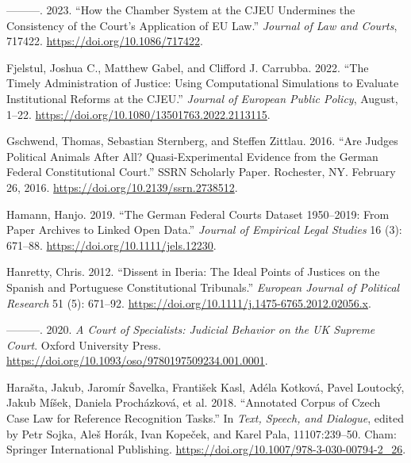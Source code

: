 \documentclass[
  11pt,
]{article}
\newlength{\cslhangindent}
\newenvironment{CSLReferences}[2] %
 {%
  \setlength{\parindent}{0pt}
  \ifodd #1 \everypar{\setlength{\hangindent}{\cslhangindent}}\ignorespaces\fi
  \ifnum #2 > 0
  \setlength{\parskip}{#2\baselineskip}
  \fi
 }%
 {}
\begin{document}
\begin{CSLReferences}{1}{0}
\leavevmode{}%
---------. 2023. {``How the {Chamber System} at the {CJEU Undermines}
the {Consistency} of the {Court}'s {Application} of {EU Law}.''}
\emph{Journal of Law and Courts}, 717422.
\url{https://doi.org/10.1086/717422}.

\leavevmode{}%
Fjelstul, Joshua C., Matthew Gabel, and Clifford J. Carrubba. 2022.
{``The Timely Administration of Justice: Using Computational Simulations
to Evaluate Institutional Reforms at the {CJEU}.''} \emph{Journal of
European Public Policy}, August, 1--22.
\url{https://doi.org/10.1080/13501763.2022.2113115}.

\leavevmode{}%
Gschwend, Thomas, Sebastian Sternberg, and Steffen Zittlau. 2016. {``Are
{Judges Political Animals} After {All}? {Quasi-Experimental Evidence}
from the {German Federal Constitutional Court}.''} SSRN Scholarly Paper.
{Rochester, NY}. February 26, 2016.
\url{https://doi.org/10.2139/ssrn.2738512}.

\leavevmode{}%
Hamann, Hanjo. 2019. {``The {German Federal Courts Dataset} 1950--2019:
{From Paper Archives} to {Linked Open Data}.''} \emph{Journal of
Empirical Legal Studies} 16 (3): 671--88.
\url{https://doi.org/10.1111/jels.12230}.

\leavevmode{}%
Hanretty, Chris. 2012. {``Dissent in {Iberia}: {The} Ideal Points of
Justices on the {Spanish} and {Portuguese Constitutional Tribunals}.''}
\emph{European Journal of Political Research} 51 (5): 671--92.
\url{https://doi.org/10.1111/j.1475-6765.2012.02056.x}.

\leavevmode{}%
---------. 2020. \emph{A {Court} of {Specialists}: {Judicial Behavior}
on the {UK Supreme Court}}. {Oxford University Press}.
\url{https://doi.org/10.1093/oso/9780197509234.001.0001}.

\leavevmode{}%
Harašta, Jakub, Jaromír Šavelka, František Kasl, Adéla Kotková, Pavel
Loutocký, Jakub Míšek, Daniela Procházková, et al. 2018. {``Annotated
{Corpus} of {Czech Case Law} for {Reference Recognition Tasks}.''} In
\emph{Text, {Speech}, and {Dialogue}}, edited by Petr Sojka, Aleš Horák,
Ivan Kopeček, and Karel Pala, 11107:239--50. {Cham}: {Springer
International Publishing}.
\url{https://doi.org/10.1007/978-3-030-00794-2_26}.


\end{CSLReferences}
\end{document}
